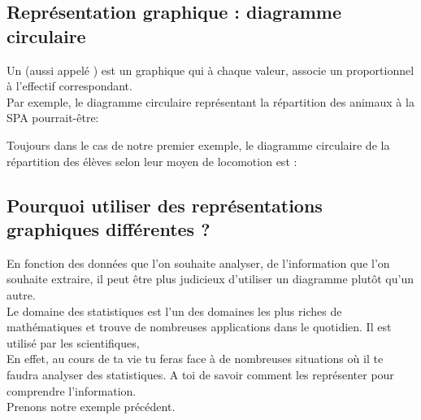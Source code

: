 \subsection{Représentation graphique : diagramme circulaire}
\begin{definitionbox}
    Un  (aussi appelé ) est un
    graphique qui à chaque valeur, associe un 
     proportionnel à l'effectif correspondant. \\

    Par exemple, le diagramme circulaire représentant la répartition des animaux à la SPA pourrait-être:

    \begin{center}
    \end{center}


\end{definitionbox}
\begin{exempleboxsuite}
    Toujours dans le cas de notre premier exemple, le diagramme circulaire de la
    répartition des élèves selon leur moyen de locomotion est : 
    \begin{center}
    \end{center}

\end{exempleboxsuite}


\subsection{Pourquoi utiliser des représentations graphiques différentes ?}
\begin{remarquebox}
    En fonction des données que l'on souhaite analyser, de l'information
    que l'on souhaite extraire, il peut être plus judicieux d'utiliser un
    diagramme plutôt qu'un autre. \\

    Le domaine des statistiques est l'un des domaines les plus riches de
    mathématiques et trouve de nombreuses applications dans le quotidien. Il est
    utilisé par les scientifiques,  \\

    En effet, au cours de ta vie tu feras face à de nombreuses situations où il
    te faudra analyser des statistiques. A toi de savoir comment les représenter
    pour comprendre l'information. \\

    Prenons notre exemple précédent.
\end{remarquebox}

